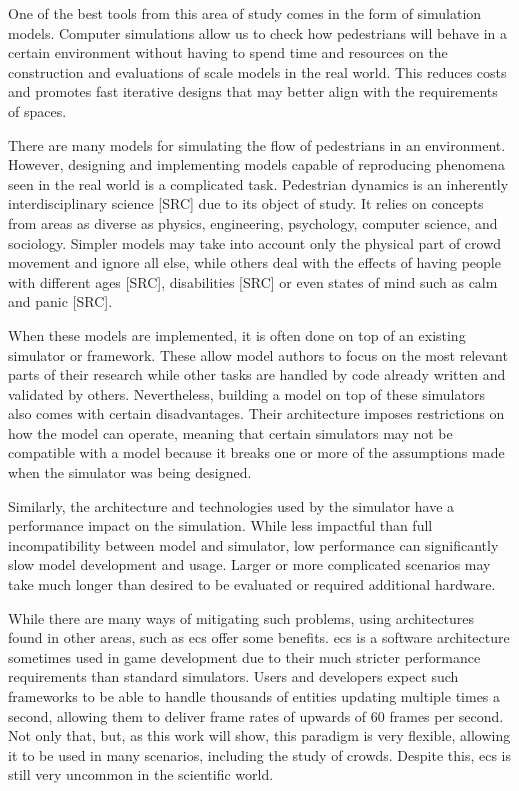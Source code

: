 \documentclass[twoside, 11pt]{article}
\begin{document}
One of the best tools from this area of study comes in the form of simulation models. Computer simulations allow us to check how pedestrians will behave in a certain environment without having to spend time and resources on the construction and evaluations of scale models in the real world. This reduces costs and promotes fast iterative designs that may better align with the requirements of spaces.

There are many models for simulating the flow of pedestrians in an environment. However, designing and implementing models capable of reproducing phenomena seen in the real world is a complicated task. Pedestrian dynamics is an inherently interdisciplinary science [SRC] due to its object of study. It relies on concepts from areas as diverse as physics, engineering, psychology, computer science, and sociology. Simpler models may take into account only the physical part of crowd movement and ignore all else, while others deal with the effects of having people with different ages [SRC], disabilities [SRC] or even states of mind such as calm and panic [SRC].

When these models are implemented, it is often done on top of an existing simulator or framework. These allow model authors to focus on the most relevant parts of their research while other tasks are handled by code already written and validated by others. Nevertheless, building a model on top of these simulators also comes with certain disadvantages. Their architecture imposes restrictions on how the model can operate, meaning that certain simulators may not be compatible with a model because it breaks one or more of the assumptions made when the simulator was being designed.

Similarly, the architecture and technologies used by the simulator have a performance impact on the simulation. While less impactful than full incompatibility between model and simulator, low performance can significantly slow model development and usage. Larger or more complicated scenarios may take much longer than desired to be evaluated or required additional hardware.

While there are many ways of mitigating such problems, using architectures found in other areas, such as \gls{ecs} offer some benefits. \gls{ecs} is a software architecture sometimes used in game development due to their much stricter performance requirements than standard simulators. Users and developers expect such frameworks to be able to handle thousands of entities updating multiple times a second, allowing them to deliver frame rates of upwards of 60 frames per second. Not only that, but, as this work will show, this paradigm is very flexible, allowing it to be used in many scenarios, including the study of crowds. Despite this, \gls{ecs} is still very uncommon in the scientific world.
\end{document}
